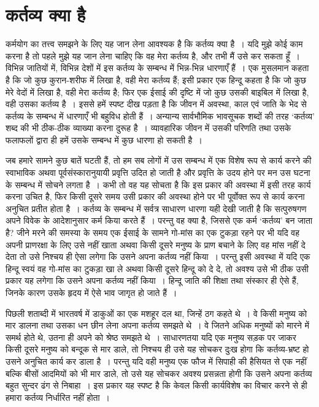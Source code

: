 
\chapter{कर्तव्य क्या है}

कर्मयोग का तत्त्व समझने के लिए यह जान लेना आवश्यक है कि कर्तव्य क्या है~। यदि मुझे कोई काम करना है तो पहले मुझे यह जान लेना चाहिए कि वह मेरा कर्तव्य है, और तभी मैं उसे कर सकता हूँ~। विभिन्न जातियों में, विभिन्न देशों में इस कर्तव्य के सम्बन्ध में भिन्न-भिन्न धारणाएँ हैं~। एक मुसलमान कहता है कि जो कुछ कुरान-शरीफ में लिखा है, वही मेरा कर्तव्य हैं; इसी प्रकार एक हिन्दू कहता है कि जो कुछ मेरे वेदों में लिखा है, वही मेरा कर्तव्य है; फिर एक ईसाई की दृष्टि में जो कुछ उसकी बाइबिल में लिखा है, वही उसका कर्तव्य है~। इससे हमें स्पष्ट दीख पड़ता है कि जीवन में अवस्था, काल एवं जाति के भेद से कर्तव्य के सम्बन्ध में धारणाएँ भी बहुविध होती हैं~। अन्यान्य सार्वभौमिक भावसूचक शब्दों की तरह ‘कर्तव्य’ शब्द की भी ठीक-ठीक व्याख्या करना दुरूह है~। व्यावहारिक जीवन में उसकी परिणति तथा उसके फलाफलों द्वारा ही हमें उसके सम्बन्ध में कुछ धारणा हो सकती है~।

जब हमारे सामने कुछ बातें घटती हैं, तो हम सब लोगों में उस सम्बन्ध में एक विशेष रूप से कार्य करने की स्वाभाविक अथवा पूर्वसंस्कारानुयायी प्रवृत्ति उदित हो जाती है और प्रवृत्ति के उदय होने पर मन उस घटना के सम्बन्ध में सोचने लगता है~। कभी तो वह यह सोचता है कि इस प्रकार की अवस्था में इसी तरह कार्य करना उचित है, फिर किसी दूसरे समय उसी प्रकार की अवस्था होने पर भी पूर्वोक्त रूप से कार्य करना अनुचित प्रतीत होता है~। कर्तव्य के सम्बन्ध में सर्वत्र साधारण धारणा यही देखी जाती है कि सत्पुरुषगण अपने विवेक के आदेशानुसार कर्म किया करते हैं~। परन्तु वह क्या है, जिससे एक कर्म ‘कर्तव्य’ बन जाता है? जीने मरने की समस्या के समय एक ईसाई के सामने गो-मांस का एक टुकड़ा रहने पर भी यदि वह अपनी प्राणरक्षा के लिए उसे नहीं खाता अथवा किसी दूसरे मनुष्य के प्राण बचाने के लिए वह मांस नहीं दे देता तो उसे निश्चय ही ऐसा लगेगा कि उसने अपना कर्तव्य नहीं किया~। परन्तु इसी अवस्था में यदि एक हिन्दू स्वयं वह गो-मांस का टुकड़ा खा ले अथवा किसी दूसरे हिन्दू को दे दे, तो अवश्य उसे भी ठीक उसी प्रकार यह लगेगा कि उसने अपना कर्तव्य नहीं किया~। हिन्दू जाति की शिक्षा तथा संस्कार ही ऐसे हैं, जिनके कारण उसके हृदय में ऐसे भाव जागृत हो जाते हैं~।

पिछली शताब्दी में भारतवर्ष में डाकुओं का एक मशहूर दल था, जिन्हें ठग कहते थे~। वे किसी मनुष्य को मार डालना तथा उसका धन छीन लेना अपना कर्तव्य समझते थे~। वे जितने अधिक मनुष्यों को मारने में समर्थ होते थे, उतना ही अपने को श्रेष्ठ समझते थे~। साधारणतया यदि एक मनुष्य सड़क पर जाकर किसी दूसरे मनुष्य को बन्दूक से मार डाले, तो निश्चय ही उसे यह सोचकर दुःख होगा कि कर्तव्य-भ्रष्ट हो उसने अनुचित कार्य कर डाला है~। परन्तु यदि वही मनुष्य एक फौज में सिपाही की हैसियत से एक नहीं बल्कि बीसों आदमियों को भी मार डाले, तो उसे यह सोचकर अवश्य प्रसन्नता होगी कि उसने अपना कर्तव्य बहुत सुन्दर ढंग से निबाहा~। इस प्रकार यह स्पष्ट है कि केवल किसी कार्यविशेष का विचार करने से ही हमारा कर्तव्य निर्धारित नहीं होता~।

